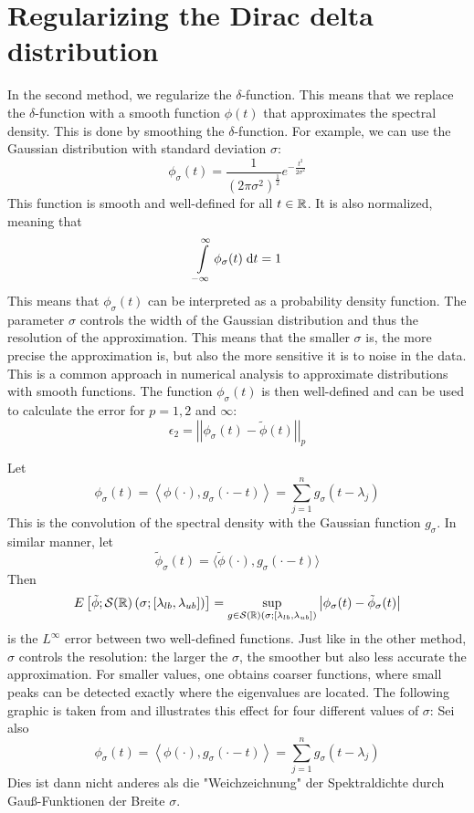 \section{Regularizing the Dirac delta distribution}
In the second method, we regularize the $\delta$-function.
This means that we replace the $\delta$-function with a smooth function $\phi(t)$
that approximates the spectral density.
This is done by smoothing the $\delta$-function.
For example, we can use the Gaussian distribution with standard deviation $\sigma$:
$$\phi_{\sigma}(t) = \frac{1}{(2\pi\sigma^2)^\frac{1}{2}}e^{-\frac{t^2}{2\sigma^2}}$$
This function is smooth and well-defined for all $t \in \mathbb{R}$.
It is also normalized, meaning that
$$\int\limits_{-\infty}^{\infty} \phi_{\sigma}(t) \;\mathrm{d}t = 1$$
This means that $\phi_{\sigma}(t)$ can be interpreted as a probability density function.
The parameter $\sigma$ controls the width of the Gaussian distribution
and thus the resolution of the approximation.
This means that the smaller $\sigma$ is, the more precise the approximation is,
but also the more sensitive it is to noise in the data.
This is a common approach in numerical analysis to approximate distributions with smooth functions.
The function $\phi_{\sigma}(t)$ is then well-defined and can be used to calculate the error for $p=1, 2$ and $\infty$:
\[
\epsilon_2 = \left|\left| \phi_{\sigma}(t) - \tilde{\phi}(t) \right|\right|_p
\]

Let
\[
\phi_{\sigma}(t) = \left \langle \phi(\cdot), g_{\sigma}(\cdot - t)\right \rangle = \sum_{j = 1}^n g_{\sigma}(t - \lambda_j)
\]
This is the convolution of the spectral density with the Gaussian function $g_{\sigma}$.
In similar manner, let
\[
\tilde{\phi}_{\sigma}(t) = \langle \tilde{\phi}(\cdot), g_{\sigma}(\cdot - t) \rangle
\]
Then
\[
E\left[\tilde{\phi};\mathcal{S}(\mathbb{R})\left(\sigma; \left[\lambda_{lb}, \lambda_{ub} \right] \right)\right] = \sup_{g \in \mathcal{S}(\mathbb{R})(\sigma;[\lambda_{lb}, \lambda_{ub}])} \left| \phi_{\sigma}(t) - \tilde{\phi}_{\sigma}(t) \right|
\]
is the $L^\infty$ error between two well-defined functions.
Just like in the other method, $\sigma$ controls the resolution:
the larger the $\sigma$, the smoother but also less accurate the approximation.
For smaller values, one obtains coarser functions,
where small peaks can be detected exactly where the eigenvalues are located.
The following graphic is taken from \cite[p.~6]{linsaadyang14} and illustrates this effect for four different values of $\sigma$:
Sei also
$$\phi_{\sigma}(t) = \left \langle \phi(\cdot), g_{\sigma}(\cdot - t)\right \rangle = \sum_{j = 1}^n g_{\sigma}(t - \lambda_j)$$
Dies ist dann nicht anderes als die "Weichzeichnung" der Spektraldichte durch Gauß-Funktionen der Breite $\sigma$.

